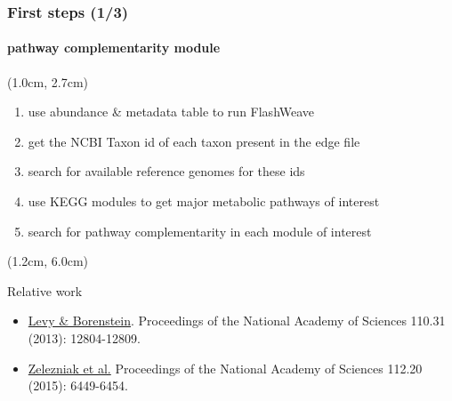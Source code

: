 \documentclass{beamer}
\begin{document}
   \begin{frame}
      \frametitle{First steps (1/3)}
      \framesubtitle{pathway complementarity module}

      \begin{singlespace}
         
         \begin{textblock*}{10cm}(1.0cm, 2.7cm)
            
            \begin{enumerate}
               \small \item use abundance \& metadata table to run FlashWeave
               \small \item get the NCBI Taxon id of each taxon present in the edge file
               \small \item search for available reference genomes for these ids 
               \small \item use KEGG modules to get major metabolic pathways of interest
               \small \item search for pathway complementarity in each module of interest
            \end{enumerate}

         \end{textblock*}

         \begin{textblock*}{10cm}(1.2cm, 6.0cm)

            \scriptsize Relative work \\ 
            \begin{itemize}
               \scriptsize \item \href{https://www.pnas.org/content/110/31/12804}{Levy \& Borenstein}. Proceedings of the National Academy of Sciences 110.31 (2013): 12804-12809. \\
               \scriptsize \item \href{https://www.pnas.org/content/112/20/6449.long}{Zelezniak et al.} Proceedings of the National Academy of Sciences 112.20 (2015): 6449-6454. 
            \end{itemize}

         \end{textblock*}

      \end{singlespace}

   \end{frame}
\end{document}
